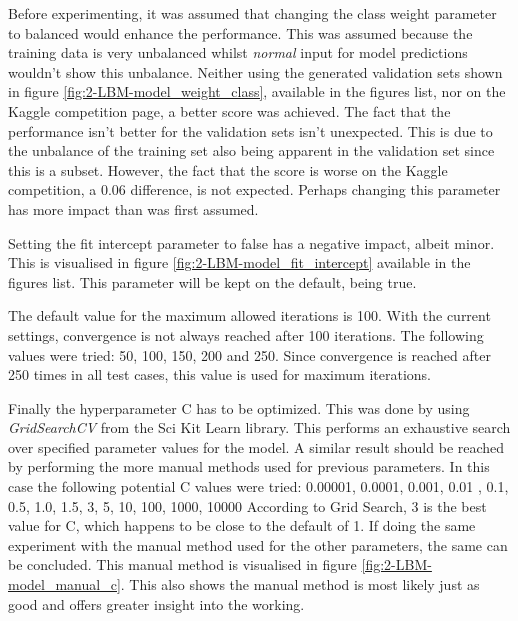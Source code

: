 Before experimenting, it was assumed that changing the class weight parameter to balanced would enhance the performance.
This was assumed because the training data is very unbalanced whilst \emph{normal} input for model predictions wouldn't show this unbalance.
Neither using the generated validation sets shown in figure \ref{fig:2-LBM-model_weight_class}, available in the figures list, nor on the Kaggle competition page, a better score was achieved.
The fact that the performance isn't better for the validation sets isn't unexpected.
This is due to the unbalance of the training set also being apparent in the validation set since this is a subset.
However, the fact that the score is worse on the Kaggle competition, a 0.06 difference, is not expected.
Perhaps changing this parameter has more impact than was first assumed.

Setting the fit intercept parameter to false has a negative impact, albeit minor.
This is visualised in figure \ref{fig:2-LBM-model_fit_intercept} available in the figures list.
This parameter will be kept on the default, being true.

The default value for the maximum allowed iterations is 100.
With the current settings, convergence is not always reached after 100 iterations.
The following values were tried: 50, 100, 150, 200 and 250.
Since convergence is reached after 250 times in all test cases, this value is used for maximum iterations.

Finally the hyperparameter C has to be optimized.
This was done by using \emph{GridSearchCV} from the Sci Kit Learn library.
This performs an exhaustive search over specified parameter values for the model.
A similar result should be reached by performing the more manual methods used for previous parameters.
In this case the following potential C values were tried: 0.00001, 0.0001, 0.001, 0.01 , 0.1, 0.5, 1.0, 1.5, 3, 5, 10, 100, 1000, 10000
According to Grid Search, 3 is the best value for C, which happens to be close to the default of 1.
If doing the same experiment with the manual method used for the other parameters, the same can be concluded.
This manual method is visualised in figure \ref{fig:2-LBM-model_manual_c}.
This also shows the manual method is most likely just as good and offers greater insight into the working.


